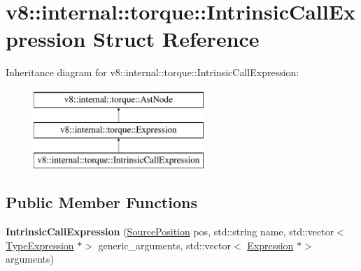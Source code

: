 \hypertarget{structv8_1_1internal_1_1torque_1_1IntrinsicCallExpression}{}\section{v8\+:\+:internal\+:\+:torque\+:\+:Intrinsic\+Call\+Expression Struct Reference}
\label{structv8_1_1internal_1_1torque_1_1IntrinsicCallExpression}
Inheritance diagram for v8\+:\+:internal\+:\+:torque\+:\+:Intrinsic\+Call\+Expression\+:\begin{figure}[H]
\begin{center}
\leavevmode
\includegraphics[height=3.000000cm]{structv8_1_1internal_1_1torque_1_1IntrinsicCallExpression}
\end{center}
\end{figure}
\subsection*{Public Member Functions}
\begin{DoxyCompactItemize}
\item 
\mbox{\label{structv8_1_1internal_1_1torque_1_1IntrinsicCallExpression_a59f90b66e7e81fda5c54d8c9f0639167}} 
{\bfseries Intrinsic\+Call\+Expression} (\mbox{\hyperlink{structv8_1_1internal_1_1torque_1_1SourcePosition}{Source\+Position}} pos, std\+::string name, std\+::vector$<$ \mbox{\hyperlink{structv8_1_1internal_1_1torque_1_1TypeExpression}{Type\+Expression}} $\ast$$>$ generic\+\_\+arguments, std\+::vector$<$ \mbox{\hyperlink{structv8_1_1internal_1_1torque_1_1Expression}{Expression}} $\ast$$>$ arguments)
\end{DoxyCompactItemize}
